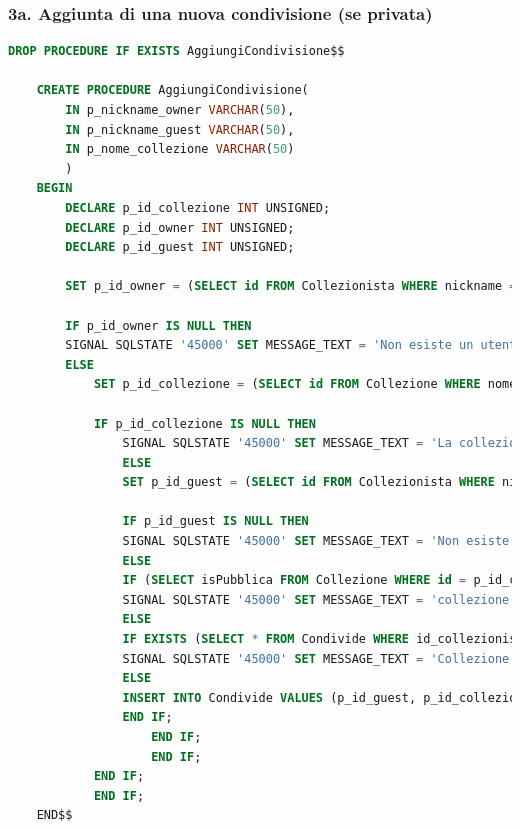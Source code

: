 \documentclass{article}
\begin{document}
\subsubsection*{3a. Aggiunta di una nuova condivisione (se privata)}
\begin{lstlisting}[language=SQL]
    DROP PROCEDURE IF EXISTS AggiungiCondivisione$$
    
    CREATE PROCEDURE AggiungiCondivisione(
        IN p_nickname_owner VARCHAR(50),
        IN p_nickname_guest VARCHAR(50),
        IN p_nome_collezione VARCHAR(50)
        )
    BEGIN
        DECLARE p_id_collezione INT UNSIGNED;
        DECLARE p_id_owner INT UNSIGNED;
        DECLARE p_id_guest INT UNSIGNED;
        
        SET p_id_owner = (SELECT id FROM Collezionista WHERE nickname = p_nickname_owner);
        
        IF p_id_owner IS NULL THEN
        SIGNAL SQLSTATE '45000' SET MESSAGE_TEXT = 'Non esiste un utente con il nickname indicato per l owner';
        ELSE
            SET p_id_collezione = (SELECT id FROM Collezione WHERE nome = p_nome_collezione AND id_collezionista = p_id_owner);
            
            IF p_id_collezione IS NULL THEN
                SIGNAL SQLSTATE '45000' SET MESSAGE_TEXT = 'La collezione non esiste';
                ELSE
                SET p_id_guest = (SELECT id FROM Collezionista WHERE nickname = p_nickname_guest);
                
                IF p_id_guest IS NULL THEN
                SIGNAL SQLSTATE '45000' SET MESSAGE_TEXT = 'Non esiste un utente con il nickname indicato per il guest';
                ELSE
                IF (SELECT isPubblica FROM Collezione WHERE id = p_id_collezione) = TRUE THEN
                SIGNAL SQLSTATE '45000' SET MESSAGE_TEXT = 'collezione pubblica, renderla privata e riprovare';
                ELSE
                IF EXISTS (SELECT * FROM Condivide WHERE id_collezionista = p_id_guest AND id_collezione = p_id_collezione) THEN
                SIGNAL SQLSTATE '45000' SET MESSAGE_TEXT = 'Collezione gia condivisa con questo utente';
                ELSE
                INSERT INTO Condivide VALUES (p_id_guest, p_id_collezione);
                END IF;
                    END IF;
                    END IF;
            END IF;
            END IF;
    END$$
\end{lstlisting}
\end{document}

